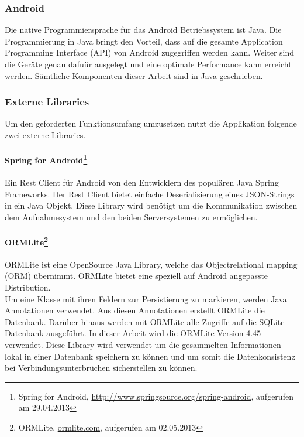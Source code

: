 \subsubsection{Android}
Die native Programmiersprache f\"{u}r das Android Betriebssystem ist Java. Die Programmierung in Java bringt den Vorteil, dass auf die gesamte Application Programming Interface (API) von Android zugegriffen werden kann. Weiter sind die Ger\"{a}te genau dafu\"{u}r ausgelegt und eine optimale Performance kann erreicht werden. S\"{a}mtliche Komponenten dieser Arbeit sind in Java geschrieben.

\subsubsection{Externe Libraries}
Um den geforderten Funktionsumfang umzusetzen nutzt die Applikation folgende zwei externe Libraries.
\paragraph{Spring for Android\footnote{Spring for Android, \url{http://www.springsource.org/spring-android}, aufgerufen am 29.04.2013} }
Ein Rest Client für Android von den Entwicklern des populären Java Spring Frameworks. Der Rest Client bietet einfache Deserialisierung eines JSON-Strings in ein Java Objekt. Diese Library wird benötigt um die Kommunikation zwischen dem Aufnahmesystem und den beiden Serversystemen zu ermöglichen.
\paragraph{ORMLite\footnote{ORMLite, \url{ormlite.com}, aufgerufen am 02.05.2013}} ORMLite ist eine OpenSource Java Library, welche das Objectrelational mapping
(ORM) übernimmt. ORMLite bietet eine speziell auf Android angepasste Distribution.\\
Um eine Klasse mit ihren Feldern zur Persistierung zu markieren, werden Java Annotationen verwendet. Aus diesen Annotationen erstellt ORMLite die Datenbank. Darüber hinaus werden mit ORMLite alle Zugriffe auf die SQLite Datenbank ausgeführt. In dieser Arbeit wird die ORMLite Version 4.45 verwendet. Diese Library wird verwendet um die gesammelten Informationen lokal in einer Datenbank speichern zu können und um somit die Datenkonsistenz bei Verbindungsunterbrüchen sicherstellen zu können.

